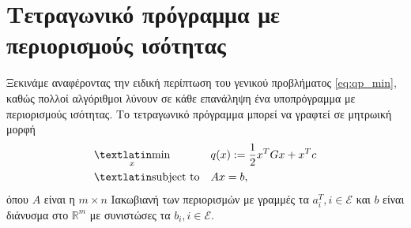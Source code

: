 \section{Τετραγωνικό πρόγραμμα με περιορισμούς ισότητας}\label{sec:qp_eq}
Ξεκινάμε αναφέροντας την ειδική περίπτωση του γενικού προβλήματος
\eqref{eq:qp_min}, καθώς πολλοί αλγόριθμοι λύνουν σε κάθε
επανάληψη ένα υποπρόγραμμα με περιορισμούς ισότητας. Το τετραγωνικό πρόγραμμα
μπορεί να γραφτεί σε μητρωική μορφή
\begin{equation}\label{eq:qp_min_eq}
    \begin{aligned}
        & \underset{x}{\text{\tl{min}}}
        & & q(x) := \frac{1}{2}x^TGx + x^Tc \\
        & \text{\tl{subject to}}
        & & Ax = b,
    \end{aligned}
\end{equation}
όπου $A$ είναι η $m\times n$ Ιακωβιανή των περιορισμών με γραμμές τα $a_i^T, i
\in \mathcal{E}$ και $b$ είναι διάνυσμα στο $\mathbb{R}^m$ με συνιστώσες τα
$b_i, i \in \mathcal{E}$.

